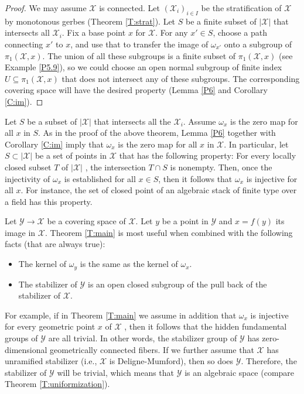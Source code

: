 \documentclass{amsart}
\theoremstyle{definition}
\theoremstyle{remark}
\theoremstyle{remark}
\newcommand{\X}{\mathcal{X}}
\newcommand{\Y}{\mathcal{Y}}
\newcommand{\ox}{\omega_x}
\newcommand{\oy}{\omega_y}
\newcommand{\pX}{\pi_1(\X,x)}
\begin{document}
\begin{proof}
We may assume $\X$ is connected. Let $(\X_i)_{i \in I}$ be the
stratification of $\X$ by monotonous gerbes (Theorem
\ref{T:strat}). Let $S$ be a finite subset of $|\X|$ that
intersects all $\X_i$. Fix a base point $x$ for $\X$. For any $x'
\in S$, choose a path connecting $x'$ to $x$, and use that to
transfer the image of $\omega_{x'}$ onto a  subgroup of $\pX$. The
union of all these subgroups is a finite subset of $\pX$ (see
Example \ref{P5.9}), so we could choose an open normal subgroup of
finite index $U \subseteq \pX$ that does not intersect any of
these subgroups. The corresponding covering space will have the
desired property (Lemma \ref{P6} and Corollary \ref{C:im}).
\end{proof}

 Let $S$ be a subset of $|\X|$ that intersects all the $\X_i$.
 Assume $\ox$ is the zero map for all $x$ in $S$. As in the proof
 of the above theorem, Lemma \ref{P6} together with Corollary
 \ref{C:im} imply that $\ox$ is the zero map for all $x$ in $\X$.
 In particular, let $S \subset |\X|$ be a set of points in $\X$
 that has the following property: For every locally closed subset
 $T$ of $|\X|$ , the intersection $T \cap S$ is nonempty. Then,
 once the injectivity of $\ox$ is established for all $x \in S$,
 then it follows that $\ox$ is injective for all $x$. For
 instance, the set of closed point of an algebraic stack of finite
 type over a field has this property.

Let $\Y \to \X$ be a covering space of $\X$. Let $y$ be a point in
$\Y$ and $x=f(y)$ its image in $\X$. Theorem \ref{T:main} is most
useful when combined with the following facts (that are always
true):

\begin{itemize}

\item  The kernel of $\oy$ is the same as the kernel of $\ox$.

\item The stabilizer of $\Y$ is an open closed subgroup of the
pull back of the stabilizer of $\X$.

\end{itemize}

 For example, if in Theorem \ref{T:main} we assume in addition
 that $\ox$ is injective for every geometric point $x$ of $\X$ ,
 then it follows that the hidden fundamental groups of $\Y$ are
 all trivial. In other words, the stabilizer group of $\Y$ has
 zero-dimensional geometrically connected fibers. If we further
 assume that $\X$ has unramified stabilizer (i.e., $\X$ is
 Deligne-Mumford), then so does $\Y$. Therefore, the stabilizer of
 $\Y$ will be trivial, which means that $\Y$ is an algebraic space
 (compare Theorem \ref{T:uniformization}).
\end{document}
